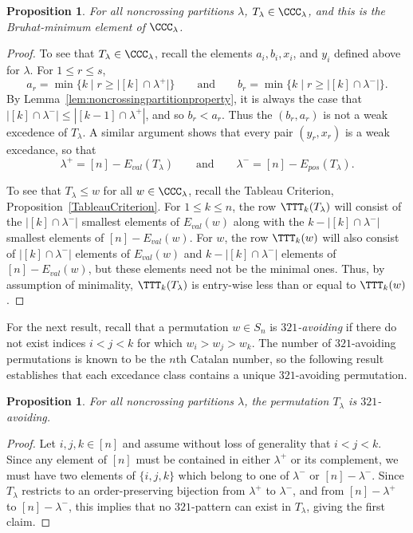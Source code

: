 \documentclass[12pt]{article}
\newtheorem{prop}[equation]{Proposition}
\theoremstyle{definition}
\theoremstyle{remark}
\numberwithin{equation}{section}
\renewcommand{\setminus}{-}
\newcommand{\EP}{E_{pos}}
\newcommand{\EV}{E_{val}}
\begin{document}
\begin{prop}
\label{prop:321avoid}
For all noncrossing partitions $\lambda$, $T_{\lambda} \in \CCC_{\lambda}$, and this is the Bruhat-minimum element of $\CCC_{\lambda}$.
\end{prop}
\begin{proof}
To see that $T_{\lambda} \in \CCC_{\lambda}$, recall the elements $a_{i}, b_{i}, x_{i}$, and $y_{i}$ defined above for $\lambda$. For $1 \le r \le s$,
\[
a_{r} = \min\{ k  \;|\;  r \ge |[k] \cap \lambda^{+}| \}
\qquad\text{and}\qquad
b_{r} = \min\{ k  \;|\;  r \ge |[k] \cap \lambda^{-}| \}.
\]
By Lemma~\ref{lem:noncrossingpartitionproperty}, it is always the case that $|[k] \cap \lambda^{-}| \le |[k-1] \cap \lambda^{+}|$, and so $b_{r} < a_{r}$.  Thus the $(b_{r}, a_{r})$ is not a weak excedence of $T_{\lambda}$.  
A similar argument shows that every pair $(y_{r}, x_{r})$ is a weak excedance, so that 
\[
\lambda^{+} = [n] \setminus \EV(T_{\lambda})
\qquad\text{and}\qquad
\lambda^{-} =  [n] \setminus \EP(T_{\lambda}).
\]

To see that $T_{\lambda} \le w$ for all $w \in \CCC_{\lambda}$, recall the Tableau Criterion, Proposition~\ref{TableauCriterion}.  
For $1 \le k \le n$, the row $\TTT_{k}(T_{\lambda})$ will consist of the $|[k] \cap \lambda^{-}|$ smallest elements of $\EV(w)$ along with the $k - |[k] \cap \lambda^{-}|$ smallest elements of $[n] \setminus \EV(w)$.  
For $w$,  the row $\TTT_{k}(w)$ will also consist of $|[k] \cap \lambda^{-}|$ elements of $\EV(w)$ and $k - |[k] \cap \lambda^{-}|$ elements of $[n] \setminus \EV(w)$, but these elements need not be the minimal ones.  
Thus, by assumption of minimality, $\TTT_{k}(T_{\lambda})$ is entry-wise less than or equal to $\TTT_{k}(w)$.
\end{proof}

For the next result, recall that a permutation $w \in S_{n}$ is \emph{$321$-avoiding} if there do not exist indices $i < j < k$ for which $w_{i} > w_{j} > w_{k}$.  The number of $321$-avoiding permutations is known to be the $n$th Catalan number, so the following result establishes that each excedance class contains a unique $321$-avoiding permutation.

\begin{prop}
For all noncrossing partitions $\lambda$, the permutation $T_{\lambda}$ is $321$-avoiding.
\end{prop}
\begin{proof}
Let $i, j, k\in [n]$ and assume without loss of generality that $i < j < k$.  Since any element of $[n]$ must be contained in either $\lambda^{+}$ or its complement, we must have two elements of $\{i, j, k\}$ which belong to one of $\lambda^{-}$ or $[n] \setminus \lambda^{-}$.  Since $T_{\lambda}$ restricts to an order-preserving bijection from $\lambda^{+}$ to $\lambda^{-}$, and from $[n] \setminus \lambda^{+}$ to $[n] \setminus \lambda^{-}$, this implies that no $321$-pattern can exist in $T_{\lambda}$, giving the first claim.
\end{proof}
\end{document}
